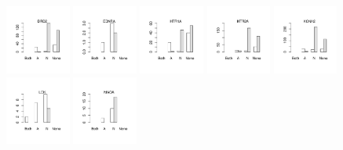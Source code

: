 \documentclass[utf8]{frontiersSCNS} %
\begin{document}
\begin{figure}[h!]
\includegraphics[width=0.19\textwidth]{figures/validation_plots/drd2_0p8_valplot.pdf}
\includegraphics[width=0.19\textwidth]{figures/validation_plots/ednra_0p8_valplot.pdf}
\vspace*{-15pt} %
\includegraphics[width=0.19\textwidth]{figures/validation_plots/htr1a_0p8_valplot.pdf}
\includegraphics[width=0.19\textwidth]{figures/validation_plots/htr2a_0p8_valplot.pdf}
\includegraphics[width=0.19\textwidth]{figures/validation_plots/kcnh2_0p8_valplot.pdf}
\includegraphics[width=0.19\textwidth]{figures/validation_plots/lck_0p8_valplot.pdf}
\includegraphics[width=0.19\textwidth]{figures/validation_plots/maoa_0p8_valplot.pdf}

\end{figure}
\end{document}
